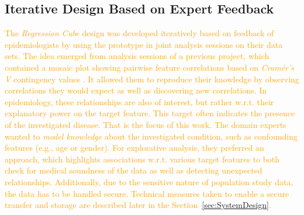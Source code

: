 \documentclass[journal]{style/vgtc} 			          %
\newcommand{\design}[1]{\textcolor{orange}{#1}}
\begin{document}
\subsection{Iterative Design Based on Expert Feedback}
\design{
The \emph{Regression Cube} design was developed iteratively based on feedback of epidemiologists by using the prototype in joint analysis sessions on their data sets.
The idea emerged from analysis sessions of a previous project, which contained a mosaic plot showing pairwise feature correlations based on \emph{Cram\'{e}r's V} contingency values \cite{Klemm2014VIS}.
It allowed them to reproduce their knowledge by observing correlations they would expect as well as discovering new correlations.
In epidemiology, these relationships are also of interest, but rather w.r.t. their explanatory power on the target feature.
This target often indicates the presence of the investigated disease.
That is the focus of this work.
The domain experts wanted to \emph{model knowledge} about the investigated condition, such as confounding features (e.g., age or gender).
For explorative analysis, they preferred an approach, which highlights associations w.r.t. various target features to both check for medical soundness of the data as well as detecting unexpected relationships.
Additionally, due to the sensitive nature of population study data, the data has to be handled secure.
Technical measures taken to enable a secure transfer and storage are described later in the Section~\ref{sec:SystemDesign}.
}
\end{document}
